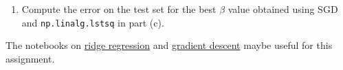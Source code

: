 \documentclass[12pt,twoside]{article}
\begin{document}
\begin{enumerate}
\begin{enumerate}
\item Compute the error on the test set for the best $\beta$ value obtained using SGD and  \texttt{np.linalg.lstsq}  in part (c).

\end{enumerate}

The notebooks on \href{https://github.com/cfgranda/math-tools-nyu/blob/main/03a%20ridge_regression.ipynb}{ridge regression} and  \href{https://github.com/cfgranda/math-tools-nyu/blob/main/03b%20gradient%20descent.ipynb}{gradient descent} maybe useful for this assignment.




 \end{enumerate}
\end{document}
